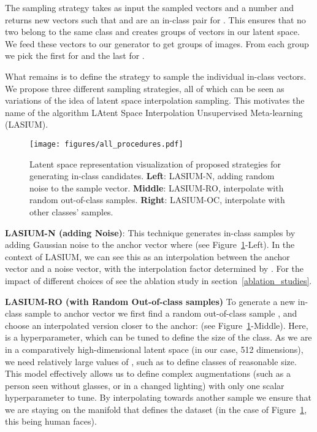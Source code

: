 \documentclass{article}
\begin{document}
The sampling strategy takes as input the sampled vectors 
and a number  
and returns  new vectors such that  and  are an in-class pair for . This ensures that no two  belong to the same class and creates  groups of  vectors in our latent space. We feed these vectors to our generator to get  groups of  images. From each group we pick the first  for  and the last  for . 

What remains is to define the strategy to sample the individual in-class vectors. We propose three different sampling strategies, all of which can be seen as variations of the idea of latent space interpolation sampling. This motivates the name of the algorithm LAtent Space Interpolation Unsupervised Meta-learning (LASIUM). 





\begin{figure}[ht]
    \centering
    \texttt{[image: figures/all\_procedures.pdf]}
    \caption{Latent space representation visualization of proposed strategies for generating in-class candidates.
    \textbf{Left}: LASIUM-N, adding random noise to the sample vector.
    \textbf{Middle}: LASIUM-RO, interpolate with random out-of-class samples.
    \textbf{Right}: LASIUM-OC, interpolate with other classes' samples.
    }
    \label{fig:gcn}
    \vspace{-4mm}
\end{figure}

{\bf{LASIUM-N} (adding Noise)}: 
This technique generates in-class samples by adding Gaussian noise to the anchor vector  where  (see Figure~\ref{fig:gcn}-Left). In the context of LASIUM, we can see this as an interpolation between the anchor vector and a noise vector, with the interpolation factor determined by . For the impact of different choices of  see the ablation study in section~\ref{ablation_studies}.









{\bf{LASIUM-RO} (with Random Out-of-class samples)} To generate a new in-class sample to anchor vector  we first find a random out-of-class sample , and choose an interpolated version closer to the anchor:  (see Figure~\ref{fig:gcn}-Middle). Here,  is a hyperparameter, which can be tuned to define the size of the class. As we are in a comparatively high-dimensional latent space (in our case, 512 dimensions), we need relatively large values of , such as  to define classes of reasonable size. This model effectively allows us to define complex augmentations (such as a person seen without glasses, or in a changed lighting) with only one scalar hyperparameter to tune. By interpolating towards another sample we ensure that we are staying on the manifold that defines the dataset (in the case of Figure~\ref{fig:gcn}, this being human faces). 
\end{document}
